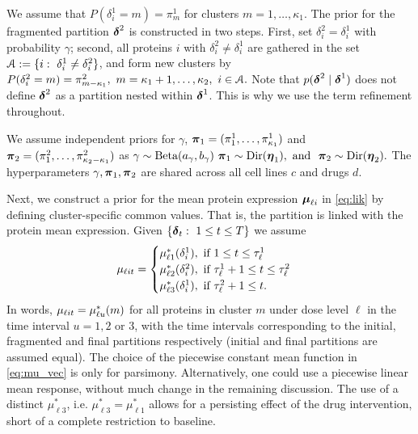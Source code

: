 We assume that 
$
P(\delta^1_i = m) = \pi^1_m
$
for clusters $m=1, \ldots, \kappa_1$.
The prior for the fragmented partition $\mbox{\boldmath $\delta$}^2$ is constructed in two steps. First, set
$\delta^2_i = \delta^1_i$ with probability $\gamma$; second, all
proteins $i$ with $\delta^2_i \not=\delta^1_i$ are gathered in the set
$\AAA:=\{i: \ \delta^1_i \neq \delta^2_i\}$, and form new
clusters by $P(\delta^2_i=m) = \pi^2_{m-\kappa_1},~ m=\kappa_1+1,\ldots,\kappa_2, \ i \in {\cal A}.$ Note that $p(\mbox{\boldmath $\delta$}^2 \mid \mbox{\boldmath $\delta$}^1)$ does not define $\mbox{\boldmath $\delta$}^2$
as a partition nested within $\mbox{\boldmath $\delta$}^1$.  This is why we use
the term refinement throughout. 

We assume independent priors for $\gamma$,
  $\mbox{\boldmath $\pi$}_1=(\pi^1_1,\ldots,\pi^1_{\kappa_1})$ and
  $\mbox{\boldmath $\pi$}_2=(\pi^2_1,\ldots,\pi^2_{\kappa_2-\kappa_1})$ as
$
   \gamma \sim \mbox{Beta}(a_\gamma, b_{\gamma})\
   \mbox{\boldmath $\pi$}_1 \sim \mbox{Dir}(\mbox{\boldmath $\eta$}_1), \mbox{ and } \
   \mbox{\boldmath $\pi$}_2 \sim \mbox{Dir}(\mbox{\boldmath $\eta$}_2).
$
The hyperparameters $\gamma, \mbox{\boldmath $\pi$}_1, \mbox{\boldmath $\pi$}_2$ are shared across all cell
lines $c$ and drugs $d$. 

Next, we construct a prior for the mean protein expression
$\mbox{\boldmath $\mu$}_{\ell i}$ in \eqref{eq:lik} by defining cluster-specific common
values.
That is, the partition is linked with the protein mean expression.
Given  $\{\mbox{\boldmath $\delta$}_{t}: \ 1\leq t \leq T\}$ we assume
\begin{equation}
\mu_{\ell it}=
\begin{cases}
\mu^*_{\ell 1}(\delta^1_i), \mbox{ if } 1\leq t \leq \tau^1_{\ell }\\
\mu^*_{\ell 2}(\delta^2_i), \mbox{ if } \tau^1_{\ell }+1 \leq t \leq \tau^2_{\ell }\\
\mu^*_{\ell 3}(\delta^1_i), \mbox{ if } \tau^2_{\ell }+1 \leq t.
\end{cases}
\label{eq:mu_vec}
\end{equation}
In words, $\mu_{\ell it} = \mu^*_{\ell u}(m)$ for all proteins in cluster $m$ under
dose level $\ell$ in the time interval $u=1,2$ or $3$, with the time
intervals corresponding to the initial, fragmented and final partitions respectively (initial and final partitions are assumed equal). The choice of the piecewise constant mean function in
\eqref{eq:mu_vec} is only for parsimony. Alternatively, one could use
a piecewise linear mean response, without much change in the remaining
discussion. The use of a distinct $\mu^*_{\ell 3}$, i.e. $\mu^{*}_{\ell 3}=\mu^{*}_{\ell 1}$ allows for a persisting effect of the drug intervention, short of a complete restriction to baseline.

